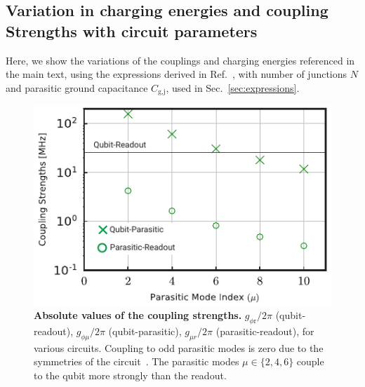 \documentclass[%
reprint,
superscriptaddress,
 amsmath,amssymb,
 aps,
 prx,
longbibliography,
floatfix,
]{revtex4-2}
\begin{document}
\subsection{Variation in charging energies and coupling Strengths with circuit parameters}\label{app:coupling}
Here, we show the variations of the couplings and charging energies referenced in the main text, using the expressions derived in Ref.~\cite{viola2015collective}, with number of junctions $N$ and parasitic ground capacitance $C_\textrm{g,j}$, used in Sec.~\ref{sec:expressions}. \begin{figure}[tbh]
    \centering
    \includegraphics[width=\linewidth]{Supp_Fig/Coupling-strength.pdf}
    \caption{{\bf Absolute values of the coupling strengths.} $g_{\phi \textrm{r}}/2\pi$ (qubit-readout), $g_{\phi\mu}/2\pi$ (qubit-parasitic), $g_{\mu r}/2\pi$ (parasitic-readout), for various circuits. Coupling to odd parasitic modes is zero due to the symmetries of the circuit~\cite{viola2015collective}. The parasitic modes $\mu\in\{2,4,6\}$ couple to the qubit more strongly than the readout.}
    \label{fig:coupling-strength}
\end{figure}
\end{document}
